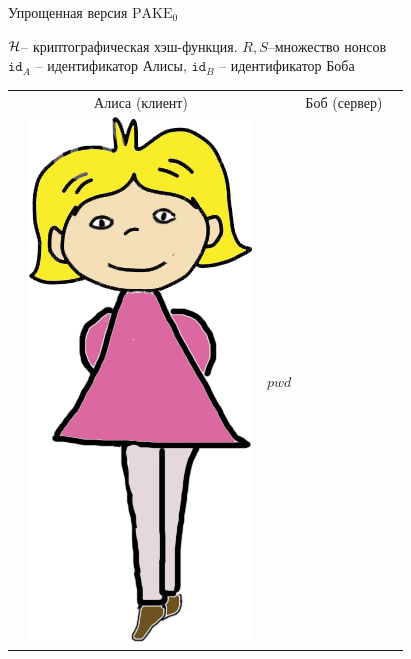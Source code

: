 \documentclass[usenames,dvipsnames,8pt,aspectratio=169]{beamer}
\begin{document}
\begin{frame}{Упрощенная версия $\text{PAKE}_0$}
\vspace{-20pt}
\Large
\begin{center}
$\mathcal{H}$-- криптографическая хэш-функция. $R, S$--множество нонсов \\[5pt]
$\mathtt{id}_{A}$ -- идентификатор Алисы, $\mathtt{id}_{B}$ -- идентификатор Боба\\[10pt]

\large 
\begin{center}
	\begin{tabular}{l c c c l}
		& Алиса (клиент)  & & Боб (сервер) &  \\
		& \multirow{5}{*}{\includegraphics[scale=0.15]{Alice}} & {\huge $pwd$} &  \hspace{-20pt}

\end{tabular}
\end{center}
\end{center}
\end{frame}
\end{document}
